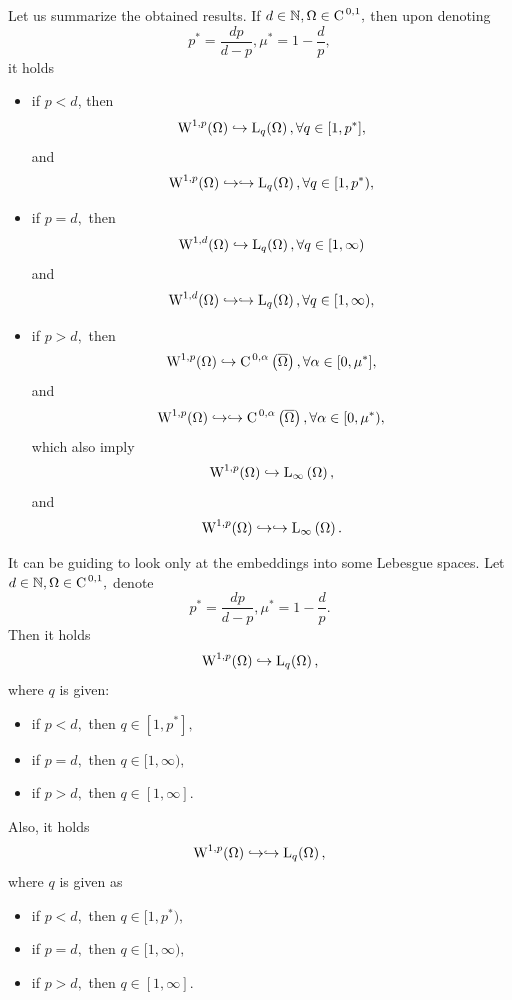 \documentclass{article}
\begin{document}
\begin{remark}[Summary]
    Let us summarize the obtained results. If $d \in {\mathbb N}, \Omega \in \text{C}^{\!\,\, 0,1},$ then upon denoting
    \[
	    p^{*} = \frac{dp}{d-p}, \mu^{*} = 1- \frac{d}{p},
    \]
    it holds

    \begin{itemize}
	    \item if $p < d$, then
		    \[
			    \WkpSet[1][p]{\Omega} \hookrightarrow \LpSet[q]{\Omega}, \forall q \in [1,p^{*}],
		    \]
		    and
		    \[
			    \WkpSet[1][p]{\Omega} \hookrightarrow \hookrightarrow \LpSet[q]{\Omega}, \forall q \in [1,p^{*}),
		    \]
	    \item if $p = d,$ then
		    \[
			    \WkpSet[1][d]{\Omega} \hookrightarrow \LpSet[q]{\Omega}, \forall q \in [1, \infty)
		    \]
		    and
		    \[
			    \WkpSet[1][d]{\Omega} \hookrightarrow \hookrightarrow \LpSet[q]{\Omega}, \forall q \in [1, \infty),
		    \]
	    \item if $p > d,$ then
		    \[
			    \WkpSet[1][p]{\Omega} \hookrightarrow \CklSet{0}{\alpha}{\overline{\Omega}}, \forall \alpha \in [0, \mu^{*}],
		    \]
		    and
		    \[
			    \WkpSet[1][p]{\Omega} \hookrightarrow \hookrightarrow \CklSet{0}{\alpha}{\overline{\Omega}}, \forall \alpha \in [0, \mu^{*}),
		    \]
		    which also imply
		    \[
			    \WkpSet[1][p]{\Omega} \hookrightarrow \LinfSet{\Omega},
		    \]
		    and
		    \[
			    \WkpSet[1][p]{\Omega} \hookrightarrow \hookrightarrow \LinfSet{\Omega}.
		    \]
		    
    \end{itemize}
\end{remark}

\begin{remark}
    It can be guiding to look only at the embeddings into some Lebesgue spaces. Let $d \in {\mathbb N}, \Omega \in \text{C}^{\!\,\, 0,1},$ denote
    \[
	    p^{*} = \frac{dp}{d-p}, \mu^{*} = 1 - \frac{d}{p}.
    \]
    Then it holds
    \[
	    \WkpSet[1][p]{\Omega} \hookrightarrow \LpSet[q]{\Omega},
    \]
    where $q$ is given: 
    \begin{itemize}
	    \item if $p<d,$ then $q \in [1, p^{*}],$
	    \item if $p=d,$ then $q \in [1, \infty),$
	    \item if $p>d,$ then $q \in [1,\infty].$
    \end{itemize}

    Also, it holds
    \[
	    \WkpSet[1][p]{\Omega} \hookrightarrow \hookrightarrow \LpSet[q]{\Omega},
    \]
    where $q$ is given as 
    \begin{itemize}
	    \item if $p<d,$ then $q \in [1, p^{*}),$
	    \item if $p=d,$ then $q \in [1,\infty),$
	    \item if $p>d,$ then $q \in [1, \infty].$
    \end{itemize}
\end{remark}
\end{document}
